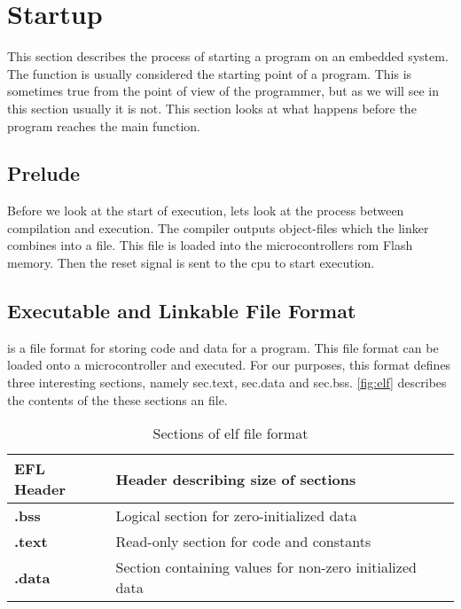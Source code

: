 \section{Startup}
\label{sec:back:startup}

This section describes the process of starting a program on an embedded system.
The {\main} function is usually considered the starting point of a program.
This is sometimes true from the point of view of the programmer, but as we will see in this section usually it is not.
This section looks at what happens before the program reaches the main function.

\subsection{Prelude}

Before we look at the start of execution, lets look at the process between compilation and execution.
The compiler outputs object-files which the linker combines into a {\elf} file.
This file is loaded into the microcontrollers \gls{rom} Flash memory.
Then the reset signal is sent to the \gls{cpu} to start execution.

\subsection{Executable and Linkable File Format}
\elf is a file format for storing code and data for a program.
This file format can be loaded onto a microcontroller and executed.
For our purposes, this format defines three interesting sections, namely {\elf}sec{.text}, {\elf}sec{.data} and {\elf}sec{.bss}.
\autoref{fig:elf} describes the contents of the these sections an {\elf} file.

\begin{table}[H]
  \centering
  \begin{tabular}{|l|l|}
    \hline
    EFL Header & Header describing size of sections \\
    \hline
    \textbf{.bss} & Logical section for zero-initialized data \\
    \hline
    \textbf{.text} & Read-only section for code and constants \\
    \hline
    \textbf{.data} & Section containing values for non-zero initialized data \\
    \hline
  \end{tabular}
  \caption{Sections of elf file format}
  \label{fig:elf}
\end{table}

